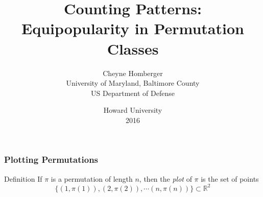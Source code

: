 \documentclass[xcolor=table,dvipsnames]{beamer}
\begin{document}
\title[Patterns in Permutations]%
  {\Large Counting Patterns: \\ \large Equipopularity in Permutation Classes}

\author{Cheyne Homberger \\[1pc] \small
University of Maryland, Baltimore County \\ 
US Department of Defense }

\date{\small Howard University \\ 2016}


\begin{frame}
  \titlepage
\end{frame}


\begin{frame} \frametitle{Plotting Permutations}
  \begin{block}{Definition}
    If $\pi$ is a permutation of length $n$, then the \emph{plot}
    of $\pi$ is the set of points 
    $$ \{ (1, \pi(1)), (2, \pi(2)), \cdots (n, \pi(n)) \} \subset \mathbb{R}^2 $$
  \end{block}

  \pause 
  \begin{center}
  \end{center}
\end{frame}
\end{document}
